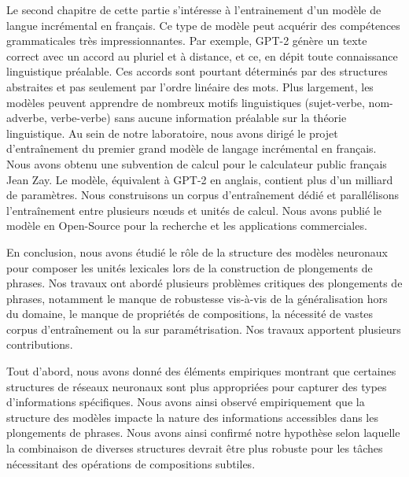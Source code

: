 Le second chapitre de cette partie s’intéresse à l’entrainement d’un modèle de langue incrémental en français. Ce type de modèle peut acquérir des compétences grammaticales très impressionnantes. Par exemple, GPT-2 génère un texte correct avec un accord au pluriel et à distance, et ce, en dépit toute connaissance linguistique préalable. Ces accords sont pourtant déterminés par des structures abstraites et pas seulement par l'ordre linéaire des mots. Plus largement, les modèles peuvent apprendre de nombreux motifs linguistiques (sujet-verbe, nom-adverbe, verbe-verbe) sans aucune information préalable sur la théorie linguistique. Au sein de notre laboratoire, nous avons dirigé le projet d'entraînement du premier grand modèle de langage incrémental en français. Nous avons obtenu une subvention de calcul pour le calculateur public français Jean Zay. Le modèle, équivalent à GPT-2 en anglais, contient plus d'un milliard de paramètres. Nous construisons un corpus d'entraînement dédié et parallélisons l'entraînement entre plusieurs nœuds et unités de calcul. Nous avons publié le modèle en Open-Source pour la recherche et les applications commerciales.

En conclusion, nous avons étudié le rôle de la structure des modèles neuronaux pour composer les unités lexicales lors de la construction de plongements de phrases. Nos travaux ont abordé plusieurs problèmes critiques des plongements de phrases, notamment le manque de robustesse vis-à-vis de la généralisation hors du domaine, le manque de propriétés de compositions, la nécessité de vastes corpus d'entraînement ou la sur paramétrisation. Nos travaux apportent plusieurs contributions. 

Tout d'abord, nous avons donné des éléments empiriques montrant que certaines structures de réseaux neuronaux sont plus appropriées pour capturer des types d'informations spécifiques. Nous avons ainsi observé empiriquement que la structure des modèles impacte la nature des informations accessibles dans les plongements de phrases. Nous avons ainsi confirmé notre hypothèse selon laquelle la combinaison de diverses structures devrait être plus robuste pour les tâches nécessitant des opérations de compositions subtiles.

